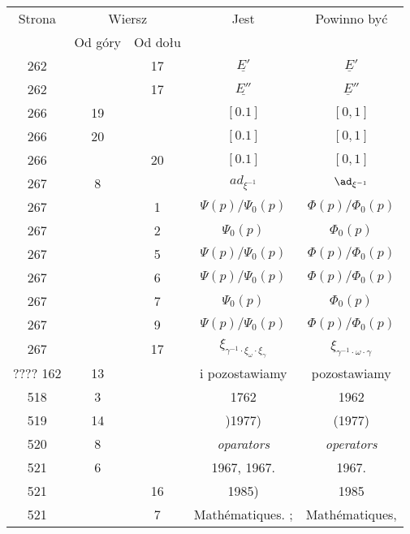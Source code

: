 \documentclass[a4paper,11pt]{article}
\numberwithin{equation}{section}
\begin{document}
\begin{center}
  \begin{tabular}{|c|c|c|c|c|}
    \hline
    Strona & \multicolumn{2}{c|}{Wiersz} & Jest
                              & Powinno być \\ \cline{2-3}
    & Od góry & Od dołu & & \\
    \hline
    262 & & 17 & $\underline{ E' }$ & $\underline{ E }'$ \\
    262 & & 17 & $\underline{ E'' }$ & $\underline{ E }''$ \\
    266 & 19 & & $[ 0. 1 ]$ & $[ 0, 1 ]$ \\
    266 & 20 & & $[ 0. 1 ]$ & $[ 0, 1 ]$ \\
    266 & & 20 & $[ 0. 1 ]$ & $[ 0, 1 ]$ \\
    267 & \hphantom{0}8 & & $ad_{ \xi^{ -1 } }$ & $\ad_{ \xi^{ -1 } }$ \\
    267 & & \hphantom{0}1 & $\Psi( p ) / \Psi_{ 0 }( p )$
    & $\Phi( p ) / \Phi_{ 0 }( p )$ \\
    267 & & \hphantom{0}2 & $\Psi_{ 0 }( p )$ & $\Phi_{ 0 }( p )$ \\
    267 & & \hphantom{0}5 & $\Psi( p ) / \Psi_{ 0 }( p )$
    & $\Phi( p ) / \Phi_{ 0 }( p )$ \\
    267 & & \hphantom{0}6 & $\Psi( p ) / \Psi_{ 0 }( p )$
    & $\Phi( p ) / \Phi_{ 0 }( p )$ \\
    267 & & \hphantom{0}7 & $\Psi_{ 0 }( p )$ & $\Phi_{ 0 }( p )$ \\
    267 & & \hphantom{0}9 & $\Psi( p ) / \Psi_{ 0 }( p )$
    & $\Phi( p ) / \Phi_{ 0 }( p )$ \\
    267 & & 17 & $\xi_{ \gamma^{ - 1 } \cdot \xi_{ \omega } \cdot \xi_{ \gamma } }$
    & $\xi_{ \gamma^{ - 1 } \cdot \omega \cdot \gamma }$ \\
    ???? 162 & 13 & & i pozostawiamy & pozostawiamy \\
    518 & \hphantom{0}3 & & 1762 & 1962 \\
    519 & 14 & & )1977) & (1977) \\
    520 & \hphantom{0}8 & & \textit{oparators} & \textit{operators} \\
    521 & \hphantom{0}6 & & 1967, 1967. & 1967. \\
    521 & & 16 & 1985) & 1985 \\
    521 & & \hphantom{0}7 & Math\'{e}matiques. ; & Math\'{e}matiques, \\
    \hline
  \end{tabular}






\end{center}
\end{document}
